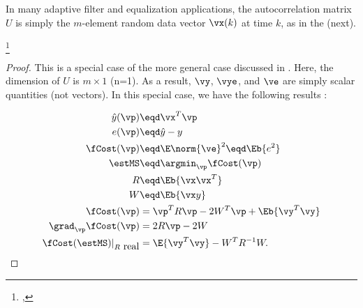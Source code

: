 In many adaptive filter and equalization applications,
the autocorrelation matrix $U$ is simply the $m$-element
random data vector $\vx(k)$ at time $k$, as in the  (next).
\begin{corollary}
\footnote{
  ,
  }
\end{corollary}
\begin{proof}
This is a special case of the more general case discussed
in .
Here, the dimension of $U$ is $m\times1$ (n=1).
As a result,
$\vy$, $\vye$, and $\ve$ are simply scalar quantities (not vectors).
In this special case, we have the following results
:

\begin{align*}
   \hat{y}(\vp)   &\eqd \vx^T \vp    \\
   e(\vp)    &\eqd \hat{y}-y \\
   \fCost(\vp) &\eqd \E\norm{\ve}^2 \eqd \Eb{e^2} \\
   \estMS      &\eqd \argmin_\vp \fCost(\vp)  \\
   R           &\eqd \Eb{\vx\vx^T}   \\
   W           &\eqd \Eb{ \vx y }    \\
    \fCost(\vp)                     &= \vp^T R \vp -2W^T\vp  + \Eb{\vy^T\vy} \\
    \grad_\vp \fCost(\vp)           &= 2R\vp - 2W  \\
    \fCost(\estMS)|_{R\mbox{ real}} &=    \E{\vy^T\vy} - W^T R^{-1}W.
\end{align*}
\end{proof}

